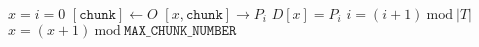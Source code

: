 \documentclass{article}
\begin{document}
\pagestyle{empty}

\newcommand{\send}{\Rightarrow}
\newcommand{\sendto}{\rightarrow}
\newcommand{\recv}{\Leftarrow}
\algrenewcommand\textproc{\textrm}

\begin{algorithmic}

  \algrenewcommand{}

  \algrenewcommand{}
  \State $x=i=0$
  \State $[\mathtt{chunk}] \gets O$
  \State $[x,\mathtt{chunk}] \sendto P_i$
  \State $D[x]=P_i$
  \State $i=(i+1)~\text{mod}~|T|$
  \State $x=(x+1)~\text{mod}~\mathtt{MAX\_CHUNK\_NUMBER}$
  \EndWhile
  \EndProcedure

  \EndProcedure
  
\end{algorithmic}
\end{document}
